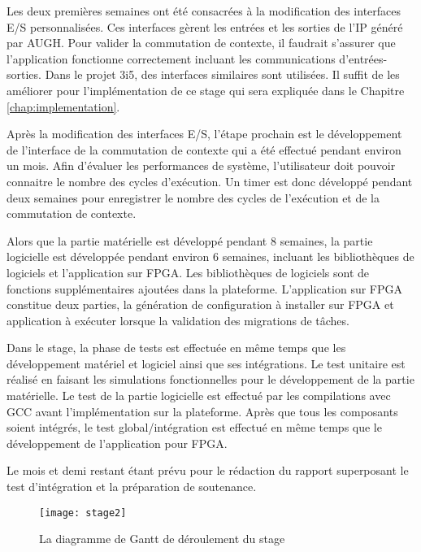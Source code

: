 Les deux premières semaines ont été consacrées à la modification des interfaces E/S personnalisées. Ces interfaces
gèrent les entrées et les sorties de l'IP généré par AUGH. Pour valider la commutation de contexte,
il faudrait s'assurer que l'application fonctionne correctement incluant les communications d'entrées-sorties.
Dans le projet 3i5, des interfaces similaires sont utilisées. Il suffit de les améliorer pour l'implémentation
de ce stage qui sera expliquée dans le Chapitre \ref{chap:implementation}.

Après la modification des interfaces E/S, l'étape prochain est le développement de l'interface de la commutation
de contexte qui a été effectué pendant environ un mois. Afin d'évaluer les performances de système, l'utilisateur doit pouvoir connaitre le
nombre des cycles d'exécution. Un timer est donc développé pendant deux semaines pour enregistrer
le nombre des cycles de l'exécution et de la commutation de contexte. 

Alors que la partie matérielle est développé pendant
8 semaines, la partie logicielle est développée pendant environ 6 semaines, incluant les bibliothèques de logiciels et l'application sur FPGA.
Les bibliothèques de logiciels sont de fonctions supplémentaires ajoutées dans la plateforme. L'application sur FPGA
constitue deux parties, la génération de configuration à installer sur FPGA et application à exécuter lorsque la validation des
migrations de tâches.

Dans le stage, la phase de tests est effectuée en même temps que les développement matériel et logiciel ainsi que ses intégrations.
Le test unitaire est réalisé en faisant les simulations fonctionnelles pour le développement de la partie matérielle.
Le test de la partie logicielle est effectué par les compilations avec GCC avant l'implémentation sur la plateforme.
Après que tous les composants soient intégrés,
le test global/intégration est effectué en même temps que le développement de l'application pour FPGA. 

Le mois et demi restant étant prévu pour le rédaction du rapport superposant le test d'intégration et la préparation
de soutenance.

\begin{figure}[h]
	\centering
	\texttt{[image: stage2]}
	\caption{La diagramme de Gantt de déroulement du stage}
	\label{fig:gantt}
	\vspace{-2mm}
\end{figure}

